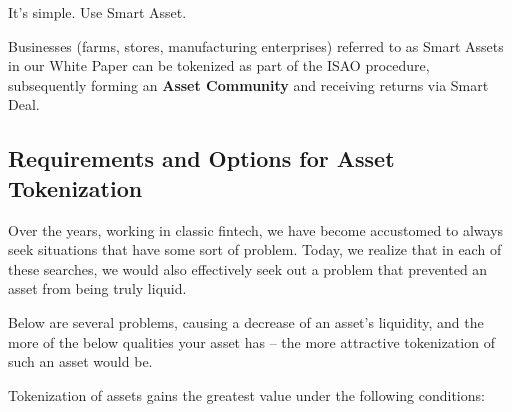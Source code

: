 \documentclass{article}
\begin{document}
\begin{multicols}{2}
It’s simple. Use Smart Asset.  

Businesses (farms, stores, manufacturing enterprises) referred to as Smart Assets in our White Paper can be tokenized as part of the ISAO procedure, subsequently forming an \textbf{Asset Community} and receiving returns via Smart Deal.

\subsection{Requirements and Options for Asset Tokenization}

Over the years, working in classic fintech, we have become accustomed to always seek situations that have some sort of problem. Today, we realize that in each of these searches, we would also effectively seek out a problem that prevented an asset from being truly liquid. 

Below are several problems, causing a decrease of an asset’s liquidity, and the more of the below qualities your asset has – the more attractive tokenization of such an asset would be. 

Tokenization of assets gains the greatest value under the following conditions:


\end{multicols}
\end{document}
